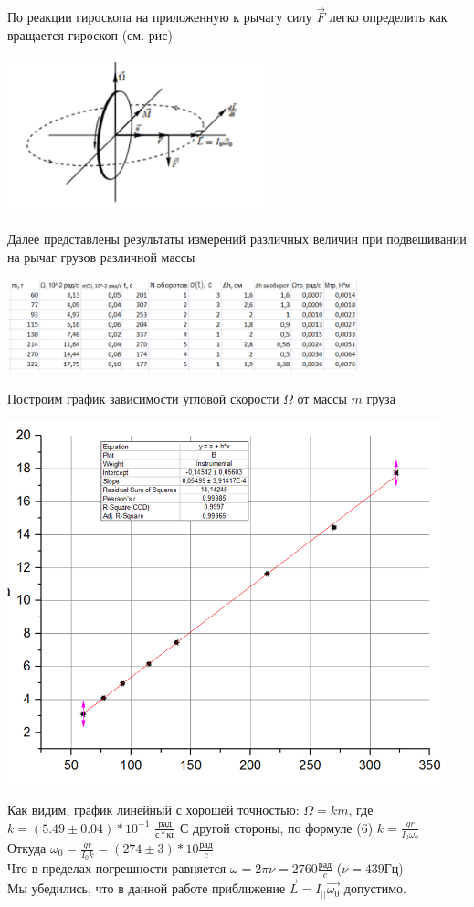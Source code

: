 \documentclass[12pt]{article}
\begin{document}
	По реакции гироскопа на приложенную к рычагу силу $\vec{F}$ легко определить как вращается гироскоп (см. рис)
	\begin{center} 
		\includegraphics[width=3in]{4_5.png}
	\end{center}
	Далее представлены результаты измерений различных величин при подвешивании на рычаг грузов различной массы
	\begin{center} 
		\includegraphics[width=4in]{4_3.png}
	\end{center}
	Построим график зависимости угловой скорости $\Omega$ от массы $m$ груза
	\begin{center} 
		\includegraphics[width=5in]{4_4.png}
	\end{center}
	Как видим, график линейный с хорошей точностью: $\Omega = km$, где $k = (5.49 \pm 0.04) * 10^{-1}$ $\frac{рад}{с*кг}$
	С другой стороны, по формуле (6) $k = \frac{gr}{I_0 \omega_0}$ \\
	Откуда $\omega_0 = \frac{gr}{I_0 k} = (274 \pm 3)*10 \frac{рад}{c} $ \\
	Что в пределах погрешности равняется $\omega = 2\pi\nu = 2760 \frac{рад}{c}$
	($\nu = 439 Гц$) \\
	Мы убедились, что в данной работе приближение $\vec{L} = I_{||}\vec{\omega_0}$ допустимо.
	
	
\end{document}
